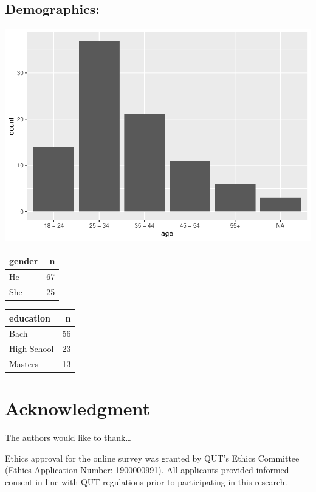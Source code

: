 \documentclass[conference,final,]{IEEEtran}
\makeatletter
\def\maxwidth{\ifdim\Gin@nat@width>\linewidth\linewidth
\else\Gin@nat@width\fi}
\let\Oldincludegraphics\includegraphics
\renewcommand{\includegraphics}[1]{\Oldincludegraphics[width=\maxwidth]{#1}}
\makeatother
\begin{document}
\hypertarget{demographics}{%
\subsection{Demographics:}\label{demographics}}

\includegraphics{paper_files/figure-latex/demogs-1.pdf}

\begin{tabular}{lr}
\toprule
gender & n\\
\midrule
He & 67\\
She & 25\\
\bottomrule
\end{tabular}

\begin{tabular}{lr}
\toprule
education & n\\
\midrule
Bach & 56\\
High School & 23\\
Masters & 13\\
\bottomrule
\end{tabular}

\hypertarget{acknowledgment}{%
\section{Acknowledgment}\label{acknowledgment}}

The authors would like to thank\ldots{}

Ethics approval for the online survey was granted by QUT's Ethics Committee (Ethics Application Number: 1900000991). All applicants provided informed consent in line with QUT regulations prior to participating in this research.
\end{document}
